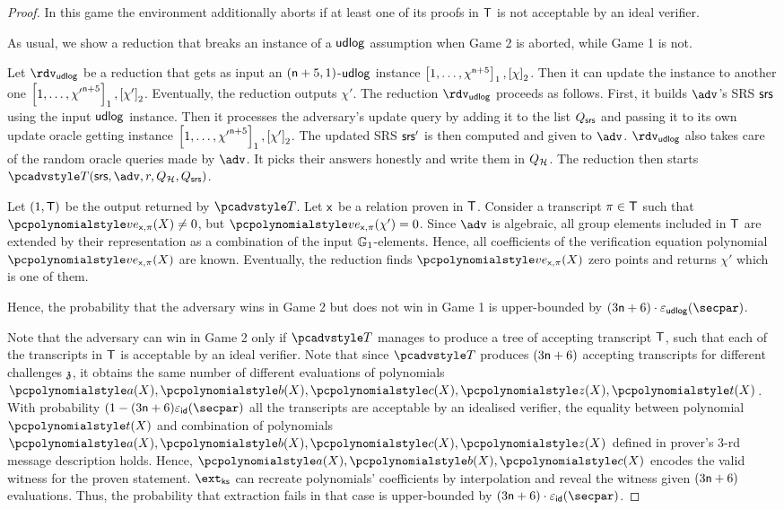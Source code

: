 \begin{proof}
  In this game the environment additionally aborts if at least one of its proofs in $\mathsf{T}$ is not acceptable by an ideal verifier.

  As usual, we show a reduction that breaks an instance of a $\mathsf{udlog}$ assumption when Game 2 is aborted, while Game 1 is not.

  Let $\rdvudlog$ be a reduction that gets as input an $(\mathsf{n} + 5, 1)$-$\mathsf{udlog}$ instance $\left[1, \ldots, \chi^{\mathsf{n} + 5}\right]_{1}, \left[\chi\right]_{2}$. Then it can update the instance to another one $\left[1, \ldots, {\chi'}^{\mathsf{n} + 5}\right]_{1}, \left[\chi'\right]_{2}$. Eventually, the reduction outputs $\chi'$.
	The reduction $\rdvudlog$ proceeds as follows.
	First, it builds $\adv$'s SRS $\mathsf{srs}$ using the input $\mathsf{udlog}$ instance. Then it processes the adversary's update query by adding it to the list $Q_{\mathsf{srs}}$ and passing it to its own update oracle getting instance $\left[1, \ldots, {\chi'}^{\mathsf{n} + 5}\right]_{1}, \left[\chi'\right]_{2}$. The updated SRS $\mathsf{srs}'$ is then computed and given to $\adv$. $\rdvdulog$ also takes care of the random oracle queries made by $\adv$. It picks their answers honestly and write them in $Q_{\mathcal{H}}$. The reduction then starts $\tdv(\srs, \adv, r, \Qro, \Qsrs)$.
	
  Let $(1, \mathsf{T})$ be the output returned by $\tdv$. Let $\mathsf{x}$ be a relation proven in $\mathsf{T}$.  Consider a transcript $\pi \in \mathsf{T}$ such that $\vereq_{\inp, \zkproof}(X) \neq 0$, but $\vereq_{\inp, \zkproof}(\chi') = 0$. Since $\adv$ is algebraic, all group elements included in $\mathsf{T}$ are extended by their representation as a combination of the input $\mathbb{G}_1$-elements. Hence, all coefficients of the verification equation polynomial $\vereq_{\inp, \zkproof}(X)$ are known. 
  Eventually, the reduction finds $\vereq_{\inp, \zkproof}(X)$ zero points and returns $\chi'$ which is one of them.
    
  Hence, the probability that the adversary wins in Game 2 but does not win in Game 1 is upper-bounded by $(3 \noofc + 6) \cdot \epsudlog (\secpar)$.

  Note that the adversary can win in Game 2 only if $\tdv$ manages to produce a tree of accepting transcript $\mathsf{T}$, such that each of the transcripts in $\mathsf{T}$ is acceptable by an ideal verifier. Note that since $\tdv$ produces $(3 \mathsf{n} + 6)$ accepting transcripts for different challenges $\mathfrak{z}$, it obtains the same number of different evaluations of polynomials $\p{a} (X), \p{b} (X), \p{c} (X), \p{z} (X), \p{t} (X)$. With probability $(1 - (3 \noofc + 6) \epsid (\secpar)$ all the transcripts are acceptable by an idealised verifier, the equality between polynomial $\p{t} (X)$ and combination of polynomials $\p{a} (X), \p{b} (X), \p{c} (X), \p{z} (X)$ defined in prover's $3$-rd message description holds. Hence, $\p{a} (X), \p{b} (X), \p{c} (X)$ encodes the valid witness for the proven statement. $\extcss$ can recreate polynomials' coefficients by interpolation and reveal the witness given $(3 \mathsf{n} + 6)$ evaluations. Thus, the probability that extraction fails in that case is upper-bounded by $(3 \noofc + 6) \cdot \epsid(\secpar)$.


\end{proof}
